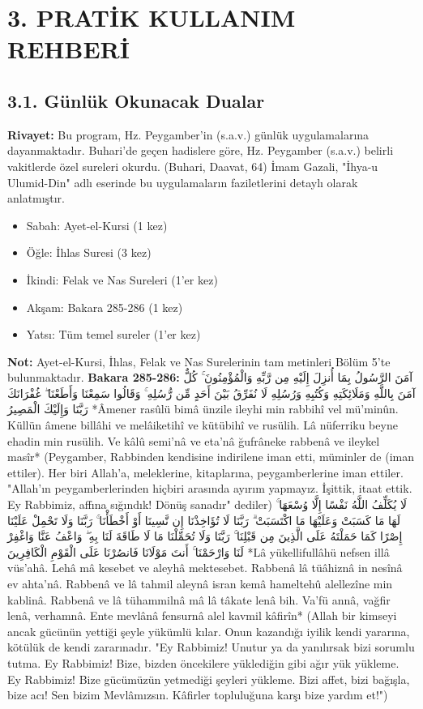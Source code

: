 \documentclass[12pt,a4paper]{article}
\begin{document}
\section{3. PRATİK KULLANIM REHBERİ}
\subsection{3.1. Günlük Okunacak Dualar}
\textbf{Rivayet:} Bu program, Hz. Peygamber'in (s.a.v.) günlük uygulamalarına dayanmaktadır. Buhari'de geçen hadislere göre, Hz. Peygamber (s.a.v.) belirli vakitlerde özel sureleri okurdu. (Buhari, Daavat, 64) İmam Gazali, "İhya-u Ulumid-Din" adlı eserinde bu uygulamaların faziletlerini detaylı olarak anlatmıştır.
\begin{itemize}
\item Sabah: Ayet-el-Kursi (1 kez)
\item Öğle: İhlas Suresi (3 kez)
\item İkindi: Felak ve Nas Sureleri (1'er kez)
\item Akşam: Bakara 285-286 (1 kez)
\item Yatsı: Tüm temel sureler (1'er kez)
\end{itemize}
\textbf{Not:} Ayet-el-Kursi, İhlas, Felak ve Nas Surelerinin tam metinleri Bölüm 5'te bulunmaktadır.
\textbf{Bakara 285-286:}
آمَنَ الرَّسُولُ بِمَا أُنزِلَ إِلَيْهِ مِن رَّبِّهِ وَالْمُؤْمِنُونَ ۚ كُلٌّ آمَنَ بِاللَّهِ وَمَلَائِكَتِهِ وَكُتُبِهِ وَرُسُلِهِ لَا نُفَرِّقُ بَيْنَ أَحَدٍ مِّن رُّسُلِهِ ۚ وَقَالُوا سَمِعْنَا وَأَطَعْنَا ۖ غُفْرَانَكَ رَبَّنَا وَإِلَيْكَ الْمَصِيرُ
*Âmener rasûlü bimâ ünzile ileyhi min rabbihî vel mü'minûn. Küllün âmene billâhi ve melâiketihî ve kütübihî ve rusülih. Lâ nüferriku beyne ehadin min rusülih. Ve kâlû semi'nâ ve eta'nâ ğufrâneke rabbenâ ve ileykel masîr*
(Peygamber, Rabbinden kendisine indirilene iman etti, müminler de (iman ettiler). Her biri Allah'a, meleklerine, kitaplarına, peygamberlerine iman ettiler. "Allah'ın peygamberlerinden hiçbiri arasında ayırım yapmayız. İşittik, itaat ettik. Ey Rabbimiz, affına sığındık! Dönüş sanadır" dediler)
لَا يُكَلِّفُ اللَّهُ نَفْسًا إِلَّا وُسْعَهَا ۚ لَهَا مَا كَسَبَتْ وَعَلَيْهَا مَا اكْتَسَبَتْ ۗ رَبَّنَا لَا تُؤَاخِذْنَا إِن نَّسِينَا أَوْ أَخْطَأْنَا ۚ رَبَّنَا وَلَا تَحْمِلْ عَلَيْنَا إِصْرًا كَمَا حَمَلْتَهُ عَلَى الَّذِينَ مِن قَبْلِنَا ۚ رَبَّنَا وَلَا تُحَمِّلْنَا مَا لَا طَاقَةَ لَنَا بِهِ ۖ وَاعْفُ عَنَّا وَاغْفِرْ لَنَا وَارْحَمْنَا ۚ أَنتَ مَوْلَانَا فَانصُرْنَا عَلَى الْقَوْمِ الْكَافِرِينَ
*Lâ yükellifullâhü nefsen illâ vüs'ahâ. Lehâ mâ kesebet ve aleyhâ mektesebet. Rabbenâ lâ tüâhiznâ in nesînâ ev ahta'nâ. Rabbenâ ve lâ tahmil aleynâ isran kemâ hameltehû alellezîne min kablinâ. Rabbenâ ve lâ tühammilnâ mâ lâ tâkate lenâ bih. Va'fü annâ, vağfir lenâ, verhamnâ. Ente mevlânâ fensurnâ alel kavmil kâfirîn*
(Allah bir kimseyi ancak gücünün yettiği şeyle yükümlü kılar. Onun kazandığı iyilik kendi yararına, kötülük de kendi zararınadır. "Ey Rabbimiz! Unutur ya da yanılırsak bizi sorumlu tutma. Ey Rabbimiz! Bize, bizden öncekilere yüklediğin gibi ağır yük yükleme. Ey Rabbimiz! Bize gücümüzün yetmediği şeyleri yükleme. Bizi affet, bizi bağışla, bize acı! Sen bizim Mevlâmızsın. Kâfirler topluluğuna karşı bize yardım et!")
\end{document}
